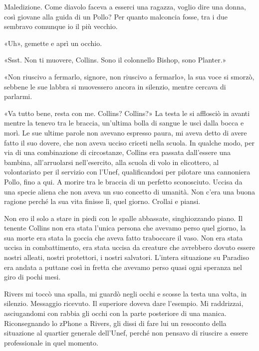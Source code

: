 Maledizione. Come diavolo faceva a esserci una ragazza, voglio dire una
donna, così giovane alla guida di un Pollo? Per quanto malconcia fosse,
tra i due sembravo comunque io il più vecchio.

«Uh», gemette e aprì un occhio.

«Ssst. Non ti muovere, Collins. Sono il colonnello Bishop, sono
Planter.»

«Non riuscivo a fermarlo, signore, non riuscivo a fermarlo», la sua voce
si smorzò, sebbene le sue labbra si muovessero ancora in silenzio,
mentre cercava di parlarmi.

«Va tutto bene, resta con me. Collins? Collins?» La testa le si
afflosciò in avanti mentre la tenevo tra le braccia, un'ultima bolla di
sangue le uscì dalla bocca e morì. Le sue ultime parole non avevano
espresso paura, mi aveva detto di avere fatto il suo dovere, che non
aveva ucciso criceti nella scuola. In qualche modo, per via di una
combinazione di circostanze, Collins era passata dall'essere una
bambina, all'arruolarsi nell'esercito, alla scuola di volo in
elicottero, al volontariato per il servizio con l'Unef, qualificandosi
per pilotare una cannoniera Pollo, fino a qui. A morire tra le braccia
di un perfetto sconosciuto. Uccisa da una specie aliena che non aveva un
suo concetto di umanità. Non c'era una buona ragione perché la sua vita
finisse lì, quel giorno. Crollai e piansi.

Non ero il solo a stare in piedi con le spalle abbassate, singhiozzando
piano. Il tenente Collins non era stata l'unica persona che avevamo
perso quel giorno, la sua morte era stata la goccia che aveva fatto
traboccare il vaso. Non era stata uccisa in combattimento, era stata
uccisa da creature che avrebbero dovuto essere nostri alleati, nostri
protettori, i nostri salvatori. L'intera situazione su Paradiso era
andata a puttane così in fretta che avevamo perso quasi ogni speranza
nel giro di pochi mesi.

Rivers mi toccò una spalla, mi guardò negli occhi e scosse la testa una
volta, in silenzio. Messaggio ricevuto. Il superiore doveva dare
l'esempio. Mi raddrizzai, asciugandomi con rabbia gli occhi con la parte
posteriore di una manica. Riconsegnando lo zPhone a Rivers, gli dissi di
fare lui un resoconto della situazione al quartier generale dell'Unef,
perché non pensavo di riuscire a essere professionale in quel momento.

